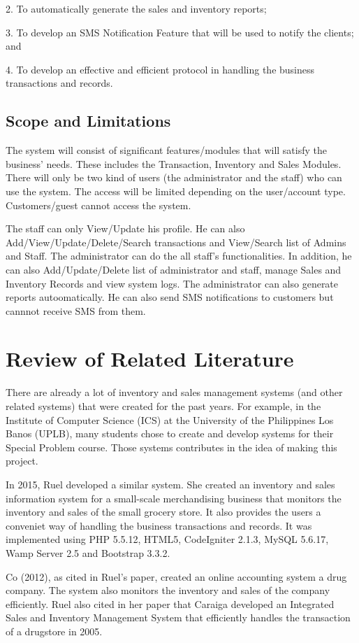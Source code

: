 \documentclass[journal]{./IEEE/IEEEtran}
\begin{document}
2. To automatically generate the sales and inventory reports;

3. To develop an SMS Notification Feature that will be used to notify the clients; and

4. To develop an effective and efficient protocol in handling the business transactions and records.

\subsection{Scope and Limitations}
The system will consist of significant features/modules that will satisfy the business’ needs. These includes the Transaction, Inventory and Sales Modules. There will only be two kind of users (the administrator and the staff) who can use the system. The access will be limited depending on the user/account type. Customers/guest cannot access the system. 

The staff can only View/Update his profile. He can also Add/View/Update/Delete/Search transactions and View/Search list of Admins and Staff. The administrator can do the all staff's functionalities. In addition, he can also Add/Update/Delete list of administrator and staff, manage Sales and Inventory Records and view system logs. The administrator can also generate reports autoomatically. He can also send SMS notifications to customers but cannnot receive SMS from them.

\section{Review of Related Literature}
There are already a lot of inventory and sales management systems (and other related systems) that were created for the past years. For example, in the Institute of Computer Science (ICS) at the University of the Philippines Los Banos (UPLB), many students chose to create and develop systems for their Special Problem course. Those systems contributes in the idea of making this project.
	
In 2015, Ruel developed a similar system. She created an inventory and sales information system for a small-scale merchandising business that monitors the inventory and sales of the small grocery store. It also provides the users a conveniet way of handling the business transactions and records. It was implemented using PHP 5.5.12, HTML5, CodeIgniter 2.1.3, MySQL 5.6.17, Wamp Server 2.5 and Bootstrap 3.3.2.


Co (2012), as cited in Ruel’s paper, created an online accounting system a drug company. The system also monitors the inventory and sales of the company efficiently. Ruel also cited in her paper that Caraiga developed an Integrated  Sales and Inventory Management System that efficiently handles the transaction of a drugstore in 2005. \cite{ruel15}
\end{document}
